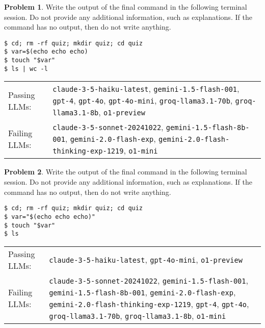\documentclass[10pt]{article}
\theoremstyle{definition}
\newtheorem{problem}{Problem}
\begin{document}
\begin{samepage}

\begin{problem}
Write the output of the final command in the following terminal session.
Do not provide any additional information,
such as explanations.
If the command has no output,
then do not write anything.

\end{problem}
\begin{lstlisting}
$ cd; rm -rf quiz; mkdir quiz; cd quiz
$ var=$(echo echo echo)
$ touch "$var"
$ ls | wc -l
\end{lstlisting}


\noindent
\begin{tabular}{p{1.0in}L{5in}}
Passing LLMs: & {\lstinline$claude-3-5-haiku-latest$}, {\lstinline$gemini-1.5-flash-001$}, {\lstinline$gpt-4$}, {\lstinline$gpt-4o$}, {\lstinline$gpt-4o-mini$}, {\lstinline$groq-llama3.1-70b$}, {\lstinline$groq-llama3.1-8b$}, {\lstinline$o1-preview$} \\
Failing LLMs: & {\lstinline$claude-3-5-sonnet-20241022$}, {\lstinline$gemini-1.5-flash-8b-001$}, {\lstinline$gemini-2.0-flash-exp$}, {\lstinline$gemini-2.0-flash-thinking-exp-1219$}, {\lstinline$o1-mini$} \\
\end{tabular}

\end{samepage}
\begin{samepage}

\begin{problem}
Write the output of the final command in the following terminal session.
Do not provide any additional information,
such as explanations.
If the command has no output,
then do not write anything.

\end{problem}
\begin{lstlisting}
$ cd; rm -rf quiz; mkdir quiz; cd quiz
$ var="$(echo echo echo)"
$ touch "$var"
$ ls
\end{lstlisting}


\noindent
\begin{tabular}{p{1.0in}L{5in}}
Passing LLMs: & {\lstinline$claude-3-5-haiku-latest$}, {\lstinline$gpt-4o-mini$}, {\lstinline$o1-preview$} \\
Failing LLMs: & {\lstinline$claude-3-5-sonnet-20241022$}, {\lstinline$gemini-1.5-flash-001$}, {\lstinline$gemini-1.5-flash-8b-001$}, {\lstinline$gemini-2.0-flash-exp$}, {\lstinline$gemini-2.0-flash-thinking-exp-1219$}, {\lstinline$gpt-4$}, {\lstinline$gpt-4o$}, {\lstinline$groq-llama3.1-70b$}, {\lstinline$groq-llama3.1-8b$}, {\lstinline$o1-mini$} \\
\end{tabular}

\end{samepage}
\end{document}
